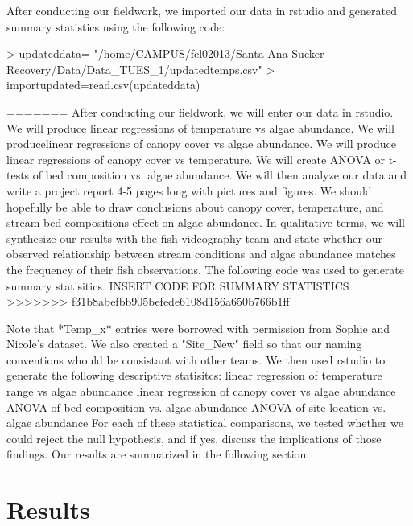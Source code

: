 \documentclass{article}
\begin{document}
After conducting our ﬁeldwork, we imported our data in rstudio and generated summary statistics using the following code: 
\begin{Schunk}
\begin{Sinput}
> updateddata= "/home/CAMPUS/fcl02013/Santa-Ana-Sucker-Recovery/Data/Data_TUES_1/updatedtemps.csv"
> importupdated=read.csv(updateddata)
\end{Sinput}
\end{Schunk}
=======
After conducting our ﬁeldwork, we will enter our data in rstudio. We will produce linear regressions of temperature vs algae abundance. We will producelinear regressions of canopy cover vs algae abundance. We will produce linear regressions of canopy cover vs temperature. We will create ANOVA or t-tests of bed composition vs. algae abundance. We will then analyze our data and write a project report 4-5 pages long with pictures and ﬁgures. We should hopefully be able to draw conclusions about canopy cover, temperature, and stream bed compositions eﬀect on algae abundance. In qualitative terms, we will synthesize our results with the ﬁsh videography team and state whether our observed relationship between stream conditions and algae abundance matches the frequency of their ﬁsh observations.
The following code was used to generate summary statisitics. 
INSERT CODE FOR SUMMARY STATISTICS
>>>>>>> f31b8abefbb905befede6108d156a650b766b1ff

Note that *Temp_x* entries were borrowed with permission from Sophie and Nicole's dataset. We also created a "Site_New" field so that our naming conventions whould be consistant with other teams. We then used rstudio to generate the following descriptive statisitcs:  
linear regression of temperature range vs algae abundance
linear regression of canopy cover vs algae abundance
ANOVA of bed composition vs. algae abundance
ANOVA of site location vs. algae abundance
For each of these statistical comparisons, we tested whether we could reject the null hypothesis, and if yes, discuss the implications of those findings. Our results are summarized in the following section. 
\section{Results}
\end{document}
